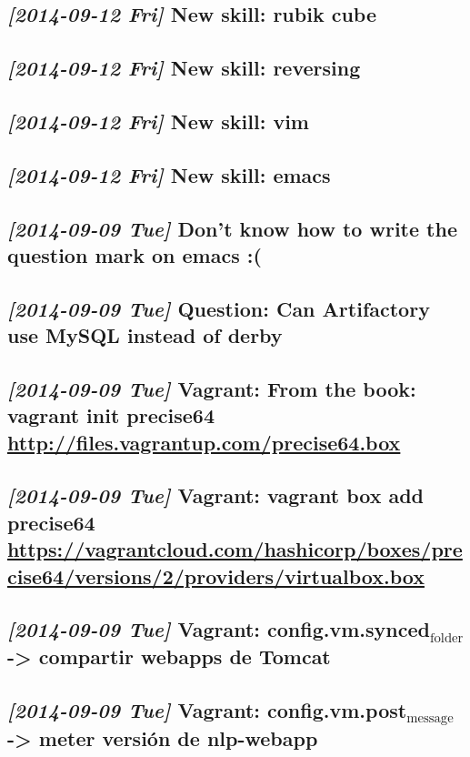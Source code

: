 \documentclass[11pt]{article}
\begin{document}
\subsection{\textit{[2014-09-12 Fri]} New skill: rubik cube}
\label{sec-1-17}
\subsection{\textit{[2014-09-12 Fri]} New skill: reversing}
\label{sec-1-18}
\subsection{\textit{[2014-09-12 Fri]} New skill: vim}
\label{sec-1-19}
\subsection{\textit{[2014-09-12 Fri]} New skill: emacs}
\label{sec-1-20}
\subsection{\textit{[2014-09-09 Tue]} Don't know how to write the question mark on emacs :(}
\label{sec-1-21}
\subsection{\textit{[2014-09-09 Tue]} Question: Can Artifactory use MySQL instead of derby}
\label{sec-1-22}
\subsection{\textit{[2014-09-09 Tue]} Vagrant: From the book: vagrant init precise64 \url{http://files.vagrantup.com/precise64.box}}
\label{sec-1-23}
\subsection{\textit{[2014-09-09 Tue]} Vagrant: vagrant box add precise64 \url{https://vagrantcloud.com/hashicorp/boxes/precise64/versions/2/providers/virtualbox.box}}
\label{sec-1-24}
\subsection{\textit{[2014-09-09 Tue]} Vagrant: config.vm.synced$_{\text{folder}}$ -> compartir webapps de Tomcat}
\label{sec-1-25}
\subsection{\textit{[2014-09-09 Tue]} Vagrant: config.vm.post$_{\text{message}}$ -> meter versión de nlp-webapp}
\label{sec-1-26}
\end{document}
